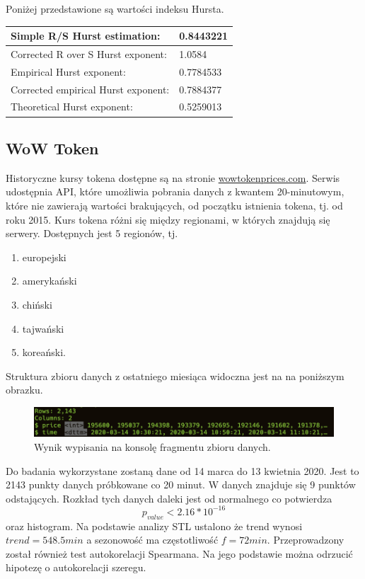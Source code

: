 \documentclass{article}
\begin{document}
Poniżej przedstawione są wartości indeksu Hursta. 
\begin{table}[H]
\begin{tabular}{|l|l|}
\hline
Simple R/S Hurst estimation:        & 0.8443221 \\ \hline
Corrected R over S Hurst exponent:  & 1.0584    \\ \hline
Empirical Hurst exponent:           & 0.7784533 \\ \hline
Corrected empirical Hurst exponent: & 0.7884377 \\ \hline
Theoretical Hurst exponent:         & 0.5259013 \\ \hline
\end{tabular}
\end{table}

\hypertarget{wow-token}{%
\subsection{WoW Token}\label{wow-token}}

Historyczne kursy tokena dostępne są na stronie
\href{https://wowtokenprices.com/}{wowtokenprices.com}. Serwis
udostępnia API, które umożliwia pobrania danych z kwantem 20-minutowym,
które nie zawierają wartości brakujących, od początku istnienia tokena,
tj. od roku 2015. Kurs tokena różni się między regionami, w których
znajdują się serwery. Dostępnych jest 5 regionów, tj.

\begin{enumerate}
\def\labelenumi{\arabic{enumi}.}
\item
  europejski
\item
  amerykański
\item
  chiński
\item
  tajwański
\item
  koreański.
\end{enumerate}

Struktura zbioru danych z ostatniego miesiąca widoczna jest na na
poniższym obrazku.

\begin{figure}[H]
  \centering
  \includegraphics[width=.75\textwidth]{./images/wt-glimpse.png}
  \caption{Wynik wypisania na konsolę fragmentu zbioru danych.}
\end{figure}

Do badania wykorzystane zostaną dane od 14 marca do 13 kwietnia 2020. Jest to 2143 punkty danych próbkowane co 20 minut.  
W danych znajduje się 9 punktów odstających. Rozkład tych danych daleki jest od normalnego co potwierdza \[p_{value}<2.16*10^{-16}\] oraz histogram. Na podstawie analizy STL ustalono że trend wynosi $trend = 548.5 min$ a sezonowość ma częstotliwość $f = 72 min$. Przeprowadzony został również test autokorelacji Spearmana. Na jego podstawie można odrzucić hipotezę o autokorelacji szeregu. 
\end{document}
